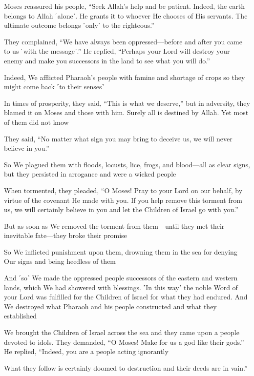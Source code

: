 Moses reassured his people, “Seek Allah’s help and be patient. Indeed, the earth belongs to Allah ˹alone˺. He grants it to whoever He chooses of His servants. The ultimate outcome belongs ˹only˺ to the righteous.”

They complained, “We have always been oppressed—before and after you came to us ˹with the message˺.” He replied, “Perhaps your Lord will destroy your enemy and make you successors in the land to see what you will do.”

Indeed, We afflicted Pharaoh’s people with famine and shortage of crops so they might come back ˹to their senses˺

In times of prosperity, they said, “This is what we deserve,” but in adversity, they blamed it on Moses and those with him. Surely all is destined by Allah. Yet most of them did not know

They said, “No matter what sign you may bring to deceive us, we will never believe in you.”

So We plagued them with floods, locusts, lice, frogs, and blood—all as clear signs, but they persisted in arrogance and were a wicked people

When tormented, they pleaded, “O Moses! Pray to your Lord on our behalf, by virtue of the covenant He made with you. If you help remove this torment from us, we will certainly believe in you and let the Children of Israel go with you.”

But as soon as We removed the torment from them—until they met their inevitable fate—they broke their promise

So We inflicted punishment upon them, drowning them in the sea for denying Our signs and being heedless of them

And ˹so˺ We made the oppressed people successors of the eastern and western lands, which We had showered with blessings. ˹In this way˺ the noble Word of your Lord was fulfilled for the Children of Israel for what they had endured. And We destroyed what Pharaoh and his people constructed and what they established

We brought the Children of Israel across the sea and they came upon a people devoted to idols. They demanded, “O Moses! Make for us a god like their gods.” He replied, “Indeed, you are a people acting ignorantly

What they follow is certainly doomed to destruction and their deeds are in vain.”

